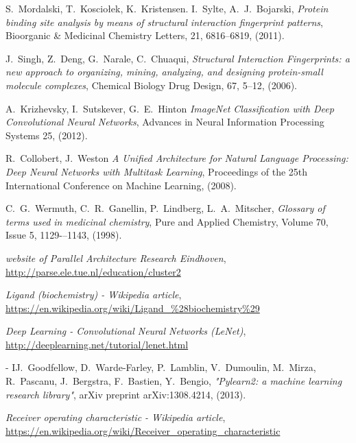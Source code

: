 \documentclass[a4paper,10pt]{report}
\begin{document}
\begin{thebibliography}{99}
      S.~Mordalski, T.~Kosciołek, K.~Kristensen. I.~Sylte, A.~J.~Bojarski,
      \textit{Protein binding site analysis by means of structural interaction fingerprint patterns},
      Bioorganic \& Medicinal Chemistry Letters, 21, 6816--6819,
      (2011).

      J.~Singh, Z.~Deng, G.~Narale, C.~Chuaqui,
      \textit{Structural Interaction Fingerprints: a new approach to organizing, mining, analyzing, and designing protein-small molecule complexes},
      Chemical Biology Drug Design, 67, 5--12,
      (2006).
      
      A.~Krizhevsky, I.~Sutskever, G.~E.~Hinton
      \textit{ImageNet Classification with Deep Convolutional Neural Networks},
      Advances in Neural Information Processing Systems 25,
      (2012).

      R.~Collobert, J.~Weston
      \textit{A Unified Architecture for Natural Language Processing: Deep Neural Networks with Multitask Learning},
      Proceedings of the 25th International Conference on Machine Learning,
      (2008).
      
      C.~G.~Wermuth, C.~R.~Ganellin, P.~Lindberg, L.~A.~Mitscher,
      \textit{Glossary of terms used in medicinal chemistry},
      Pure and Applied Chemistry, Volume 70, Issue 5, 1129-–1143,
      (1998).
      
      \textit{website of Parallel Architecture Research Eindhoven},
      \url{http://parse.ele.tue.nl/education/cluster2}

      \textit{Ligand (biochemistry) - Wikipedia article},
      \url{https://en.wikipedia.org/wiki/Ligand_%28biochemistry%29}
     
      \textit{Deep Learning - Convolutional Neural Networks (LeNet)},
      \url{http://deeplearning.net/tutorial/lenet.html}

      
      - IJ.~Goodfellow, D.~Warde-Farley, P.~Lamblin, V.~Dumoulin, M.~Mirza, R.~Pascanu, J.~Bergstra, F.~Bastien, Y.~Bengio,
      \textit{"Pylearn2: a machine learning research library"},
     arXiv preprint arXiv:1308.4214,
     (2013).

     \textit{Receiver operating characteristic - Wikipedia article},
     \url{https://en.wikipedia.org/wiki/Receiver_operating_characteristic}
     

\end{thebibliography}
\end{document}
